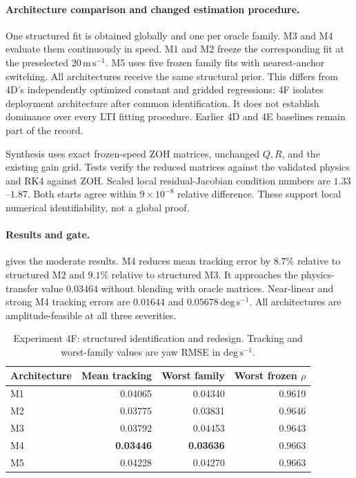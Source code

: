 \paragraph{Architecture comparison and changed estimation procedure.}
One structured fit is obtained globally and one per oracle family. M3 and M4
evaluate them continuously in speed. M1 and M2 freeze the corresponding fit at
the preselected $20\,\mathrm{m\,s^{-1}}$. M5 uses five frozen family fits
with nearest-anchor switching. All architectures receive the same structural
prior. This differs from 4D's independently optimized constant and gridded
regressions: 4F isolates deployment architecture after common identification.
It does not establish dominance over every LTI fitting procedure. Earlier
4D and 4E baselines remain part of the record.

Synthesis uses exact frozen-speed ZOH matrices, unchanged $Q,R$, and the existing
gain grid. Tests verify the reduced matrices against the validated physics and
RK4 against ZOH. Scaled local residual-Jacobian condition numbers are
$1.33$--$1.87$. Both starts agree within $9\times10^{-8}$ relative difference.
These support local numerical identifiability, not a global proof.

\paragraph{Results and gate.}
 gives the moderate results. M4 reduces mean tracking
error by $8.7\%$ relative to structured M2 and $9.1\%$ relative to structured
M3. It approaches the physics-transfer value $0.03464$ without blending with
oracle matrices. Near-linear and strong M4 tracking errors are $0.01644$ and
$0.05678\,\mathrm{deg\,s^{-1}}$. All architectures are amplitude-feasible
at all three severities.

\begin{table}[htbp]
\centering
\caption{Experiment 4F: structured identification and redesign. Tracking and
worst-family values are yaw RMSE in $\mathrm{deg\,s^{-1}}$.}
\label{tab:experiment4f}
\begin{tabular}{lrrr}
\toprule
Architecture & Mean tracking & Worst family & Worst frozen $\rho$\\
\midrule
M1 & 0.04065 & 0.04340 & 0.9619\\
M2 & 0.03775 & 0.03831 & 0.9646\\
M3 & 0.03792 & 0.04453 & 0.9643\\
M4 & \textbf{0.03446} & \textbf{0.03636} & 0.9663\\
M5 & 0.04228 & 0.04270 & 0.9663\\
\bottomrule
\end{tabular}
\end{table}

